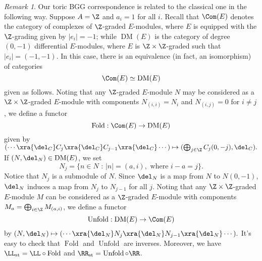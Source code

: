 \documentclass[12pt]{amsart}
\theoremstyle{definition}
\theoremstyle{remark}
\newtheorem{remark}[lemma]{Remark}
\newcommand{\michael}[1]{{\color{red} \sf $\clubsuit\clubsuit\clubsuit$ Michael: [#1]}}
\def\on{\operatorname}
\def\DM{\operatorname{DM}}
\begin{document}
\begin{remark}\label{rmk:PPn DM is complexes}
Our toric BGG correspondence is related to the classical one in the following way. Suppose $A = \Z$ and $a_i = 1$ for all $i$. Recall that $\Com(E)$ denotes the category of complexes of $\Z$-graded $E$-modules, where $E$ is equipped with the $\Z$-grading given by $|e_i| = -1$; while $\DM(E)$ is the category of degree $(0, -1)$ differential $E$-modules, where $E$ is $\Z \times \Z$-graded such that $|e_i| = (-1, -1)$. In this case, there is an equivalence (in fact, an isomorphism) of categories
$$
\Com(E) \simeq \DM(E)
$$
given as follows. Noting that any $\Z$-graded $E$-module $N$ may be considered as a $\Z \times \Z$-graded $E$-module with components $N_{(i, i)} = N_i$ and $N_{(i, j)} = 0$ for $i \ne j$, we define a functor
$$
\on{Fold} : \Com(E) \to \DM(E)
$$
given by $(\cdots \xra{\del_C} C_j \xra{\del_C} C_{j-1} \xra{\del_C} \cdots) \mapsto (\bigoplus_{j \in \Z} C_j(0, -j), \del_C).$ If $(N, \del_N) \in \DM(E)$, we set
$$
N_j = \{n \in N \text{ : } |n| = (a, i), \text{ where } i - a = j\}.
$$
Notice that $N_j$ is a submodule of $N$. Since $\del_N$ is a map from $N$ to $N(0, -1)$, $\del_N$ induces a map from $N_j$ to $N_{j -1}$ for all $j$. Noting that any $\Z \times \Z$-graded $E$-module $M$ can be considered as a $\Z$-graded $E$-module with components $M_a = \bigoplus_{i  \in \Z} M_{(a, i)}$, we define a functor
$$
\on{Unfold} : \DM(E) \to \Com(E)
$$
by $(N, \del_N) \mapsto (\cdots \xra{\del_N} N_j \xra{\del_N} N_{j-1} \xra{\del_N} \cdots ).$ It's easy to check that $\on{Fold}$ and $\on{Unfold}$ are inverses. Moreover, we have $\LL_{\on{st}} = \LL \circ \on{Fold}$ and $\RR_{\on{st}} = \on{Unfold} \circ \RR$.

\iffalse
In this case, the functors $\LL$ and $\RR$ are related to the classical BGG functors $\LL_{\on{st}}$ and $\RR_{\on{st}}$ in the following way. 

Any 
There is a functor
$$
\on{Fold} : \Com(E) \to \DM(E)
$$
given by sending a complex $C$ to the differential module $(\bigoplus_{j \in \Z} C_j(0, -j), \del_C)$, where the $C_j$ are considered as $\Z \times \Z$-graded $E$-modules. It's easy to check that $\LL_{\on{st}} = \LL \circ \on{Fold}$.

The functor $\on{Fold}$ is not an equivalence \michael{give a proof of this?}, but it induces an equivalence
$$
\Com_{\on{Free}}(E) \xra{\simeq} \DM_{\on{Free}}(E)
$$
on full subcategories given by objects whose underlying modules are free. The inverse 
$$
\on{Unfold} : \DM_{\on{Free}}(E) \to \Com_{\on{Free}}(E)
$$
is given as follows. Let $(N, \del_N) \in \DM^{\on{Free}}(E)$, and write $N = \bigoplus_{(a, i) \in \Z \times \Z} E(a, i)^{\oplus r_{a,i}}$. The associated complex $C$ is given by $C_j = \bigoplus_{a - i = j} E(a)^{\oplus r_{a,i}}$, with differential induced by $\del_N$. Notice that, since every element of $E$ has degree $(-d,-d)$ for some $0 \leq d\leq n$, and $\del_N$ is a map from $N$ to $N(0, -1)$, each summand $E(a,i)$ can only map to summands of the form $E(a-d,i-d+1)$ for some $0\leq d \leq n$.  It follows that the differential maps each $C_j$ to $C_{j-1}$. Finally, observe that $\RR_{\on{st}} = \on{Unfold} \circ \RR$.
\fi
\end{remark}
\end{document}
